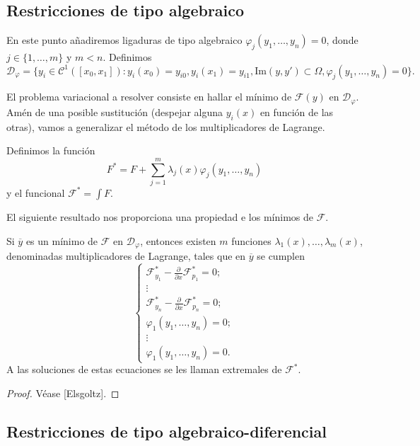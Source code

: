 \documentclass{article}
\begin{document}
\subsection{Restricciones de tipo algebraico}

En este punto añadiremos ligaduras de tipo algebraico $\varphi_j(y_1, \ldots, y_n) = 0$, donde
$j \in \{1, \ldots, m\}$ y $m < n$. Definimos
\[\mathcal{D}_\varphi = \{y_i \in \mathcal{C}^1([x_0, x_1]): y_i(x_0) = y_{i0}, y_i(x_1) = y_{i1},
  \mathrm{Im}(y, y') \subset \Omega, \varphi_j(y_1, \ldots, y_n) = 0\}.\]

El problema variacional a resolver consiste en hallar el mínimo de $\mathcal{F}(y)$ en
$\mathcal{D}_\varphi$. Amén de una posible sustitución (despejar alguna $y_i(x)$ en función de las
otras), vamos a generalizar el método de los multiplicadores de Lagrange.

 Definimos la función
\[F^* = F + \sum_{j = 1}^m \lambda_j(x) \varphi_j(y_1, \ldots, y_n)\] y el funcional
$\mathcal{F}^* = \int F$.

El siguiente resultado nos proporciona una propiedad e los mínimos de $\mathcal{F}$.

\begin{thm}
  Si $\overline{y}$ es un mínimo de $\mathcal{F}$ en $\mathcal{D}_\varphi$, entonces existen $m$
  funciones $\lambda_1(x), \ldots, \lambda_m(x)$, denominadas multiplicadores de Lagrange, tales que
  en $\overline{y}$ se cumplen
  \[
    \begin{cases}
      \mathcal{F}_{y_1}^* - \frac{\partial}{\partial x} \mathcal{F}_{p_1}^* = 0; \\
      \vdots \\
      \mathcal{F}_{y_n}^* - \frac{\partial}{\partial x} \mathcal{F}_{p_n}^* = 0; \\
      \varphi_1(y_1, \dots, y_n) = 0; \\
      \vdots \\
      \varphi_1(y_1, \dots, y_n) = 0.
    \end{cases}
  \]
  A las soluciones de estas ecuaciones se les llaman extremales de $\mathcal{F}^*$.
\end{thm}
\begin{proof}
  Véase [Elsgoltz].
\end{proof}

\subsection{Restricciones de tipo algebraico-diferencial}
\end{document}
